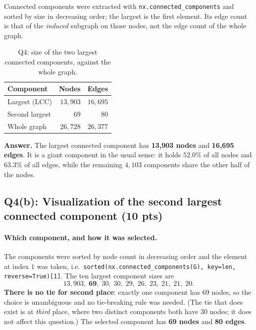 Connected components were extracted with
\texttt{nx.connected\_components} and sorted by size in decreasing order; the
largest is the first element. Its edge count is that of the \emph{induced}
subgraph on those nodes, not the edge count of the whole graph.

\begin{table}[ht]
  \centering
  \begin{tabular}{lrr}
    \toprule
    Component & Nodes & Edges \\
    \midrule
    Largest (LCC)        & $13{,}903$ & $16{,}695$ \\
    Second largest       & $69$       & $80$       \\
    \midrule
    Whole graph          & $26{,}728$ & $26{,}377$ \\
    \bottomrule
  \end{tabular}
  \caption{Q4: size of the two largest connected components, against the whole
  graph.}
  \label{p2:tab:q4}
\end{table}

\noindent\textbf{Answer.} The largest connected component has
\textbf{13{,}903 nodes} and \textbf{16{,}695 edges}. It is a giant component in
the usual sense: it holds $52.0\%$ of all nodes and $63.3\%$ of all edges, while
the remaining $4{,}103$ components share the other half of the nodes.

\subsection*{Q4(b): Visualization of the second largest connected component (10 pts)}

\paragraph{Which component, and how it was selected.}
The components were sorted by node count in decreasing order and the element at
index $1$ was taken, i.e.\ \texttt{sorted(nx.connected\_components(G),
key=len, reverse=True)[1]}. The ten largest component sizes are
\[
  13{,}903,\; \mathbf{69},\; 30,\; 30,\; 29,\; 26,\; 23,\; 21,\; 21,\; 20 .
\]
\textbf{There is no tie for second place}: exactly one component has $69$ nodes,
so the choice is unambiguous and no tie-breaking rule was needed. (The tie that
does exist is at \emph{third} place, where two distinct components both have
$30$ nodes; it does not affect this question.) The selected component has
\textbf{69 nodes} and \textbf{80 edges}.


